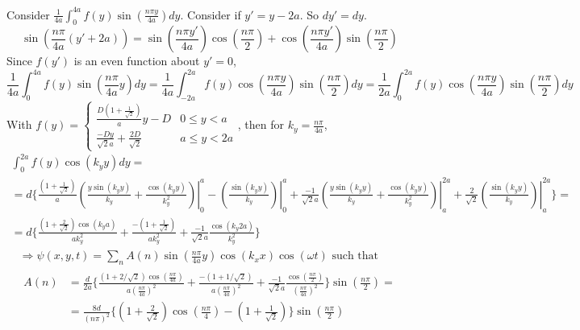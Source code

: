 \documentclass[twoside,10pt]{amsart}
\begin{document}
Consider $\frac{1}{4a} \int_0^{4a} f(y) \sin{ \left( \frac{ n \pi y }{4a} \right) } dy$.  Consider if $y' = y-2a$.  So $dy'=dy$.  
\[
\sin{ \left( \frac{ n \pi}{4a} ( y' + 2a) \right) } = \sin{ \left( \frac{ n \pi y'}{4a} \right) }\cos{ \left( \frac{n \pi}{2} \right) } + \cos{ \left( \frac{ n \pi y'}{4a} \right) } \sin{ \left( \frac{ n \pi }{2} \right) }
\]
Since $f(y')$ is an even function about $y'=0$,
\[
\frac{1}{4a} \int_0^{4a} f(y) \sin{ \left( \frac{ n \pi }{4a} y \right) } dy = \frac{1}{4a} \int_{-2a}^{2a} f(y) \cos{ \left( \frac{ n\pi y}{4a} \right) } \sin{ \left( \frac{n\pi}{2} \right) } dy = \frac{1}{2a} \int_0^{2a} f(y) \cos{ \left( \frac{ n \pi y }{4a} \right) } \sin{ \left( \frac{ n \pi}{2} \right) } dy 
\]
With $f(y) = \begin{cases} \frac{D(1 + \frac{1}{\sqrt{2}} ) }{a} y - D & 0 \leq y < a \\ \frac{ -D y }{\sqrt{2} a} + \frac{2D}{\sqrt{2}} & a \leq y < 2a \end{cases}$, then for $k_y = \frac{n\pi}{4a}$, 
\[
\begin{gathered}
  \int_0^{2a} f(y) \cos{ (k_y y )} dy = \\
  = d \{ \frac{ ( 1 + \frac{1}{\sqrt{2} })}{a} \left. \left( \frac{ y \sin{ (k_y y )} }{k_y} + \frac{ \cos{ (k_y y ) } }{ k_y^2 } \right) \right|_0^a - \left. \left( \frac{ \sin{ (k_y y)} }{k_y} \right) \right|_0^a + \frac{-1}{\sqrt{2} a} \left. \left( \frac{ y \sin{ (k_y y) } }{k_y} + \frac{ \cos{ (k_y y)}}{k_y^2} \right) \right|_a^{2a} + \frac{2}{\sqrt{2}} \left. \left( \frac{ \sin{ (k_y y) }}{k_y } \right) \right|_a^{2a} \} = \\
  =  d \{ \frac{ (1 + \frac{2}{ \sqrt{2}} ) \cos{ (k_y a) } }{ a k_y^2} + \frac{ - ( 1 + \frac{1}{\sqrt{2} } )}{a k_y^2} + \frac{-1}{\sqrt{2} a } \frac{ \cos{ (k_y 2a) }}{k_y^2} \}
\end{gathered}
\]
\[
\begin{gathered}
  \Longrightarrow \psi(x,y,t) = \sum_n A(n) \sin{ \left( \frac{ n\pi }{4a}  y \right) } \cos{ (k_x x)} \cos{( \omega t) } \text{ such that } \\
\begin{aligned}  A(n) & = \frac{d}{2a} \{ \frac{ (1 + 2/\sqrt{2} ) \cos{ \left( \frac{n\pi}{4a} \right) } }{ a \left( \frac{ n\pi}{4a} \right)^2 } + \frac{ -(1 + 1/\sqrt{2} ) }{ a \left( \frac{n\pi}{4a} \right)^2 }+ \frac{-1}{\sqrt{2} a} \frac{ \cos{ \left( \frac{ n\pi}{2} \right) } }{ \left( \frac{ n\pi}{4a} \right)^2 } \} \sin{ \left( \frac{ n\pi}{2} \right) } = \\ & = \frac{8d }{ (n\pi)^2 } \{ (1 + \frac{2}{\sqrt{2}} ) \cos{ \left( \frac{ n\pi}{4} \right) } - (1 + \frac{1}{ \sqrt{2}} ) \} \sin{ \left( \frac{ n\pi}{2} \right) }\end{aligned}
\end{gathered}
\]
\end{document}
